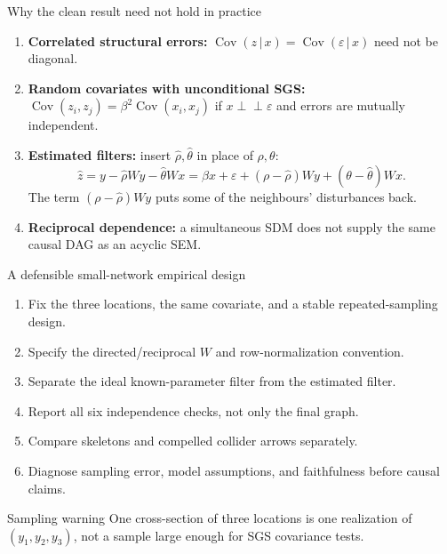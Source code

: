 \documentclass[aspectratio=169,11pt]{beamer}
\newcommand{\Cov}{\operatorname{Cov}}
\newcommand{\indep}{\mathrel{\perp\!\!\!\perp}}
\newcommand{\given}{\,\vert\,}
\begin{document}
\begin{frame}{Why the clean result need not hold in practice}
\begin{enumerate}\setlength{\itemsep}{4mm}
\item \textbf{Correlated structural errors:}
 $\Cov(z\given x)=\Cov(\varepsilon\given x)$ need not be diagonal.
\item \textbf{Random covariates with unconditional SGS:}
 $\Cov(z_i,z_j)=\beta^2\Cov(x_i,x_j)$ if $x\indep\varepsilon$ and errors are mutually independent.
\item \textbf{Estimated filters:} insert $\widehat\rho,\widehat\theta$ in place of $\rho,\theta$:
\[\widehat z=y-\widehat\rho Wy-\widehat\theta Wx=\beta x+\varepsilon+(\rho-\widehat\rho)Wy+(\theta-\widehat\theta)Wx.\]
The term $(\rho-\widehat\rho)Wy$ puts some of the neighbours' disturbances back.
\item \textbf{Reciprocal dependence:} a simultaneous SDM does not supply the same causal DAG as an acyclic SEM.
\end{enumerate}
\end{frame}

\begin{frame}{A defensible small-network empirical design}
\small
\begin{enumerate}\setlength{\itemsep}{2mm}
\item Fix the three locations, the same covariate, and a stable repeated-sampling design.
\item Specify the directed/reciprocal $W$ and row-normalization convention.
\item Separate the ideal known-parameter filter from the estimated filter.
\item Report all six independence checks, not only the final graph.
\item Compare skeletons and compelled collider arrows separately.
\item Diagnose sampling error, model assumptions, and faithfulness before causal claims.
\end{enumerate}
\vspace{1mm}
\begin{block}{Sampling warning}
One cross-section of three locations is one realization of $(y_1,y_2,y_3)$, not a sample large enough for SGS covariance tests.
\end{block}
\end{frame}
\end{document}
